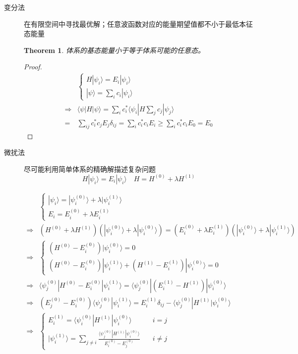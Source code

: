 \documentclass[12pt,a4paper,openany,twoside]{book}
\newtheorem{theorem}{Theorem}[section]
\numberwithin{equation}{section}
\newcommand{\ket}[1]{| #1 \rangle}
\newcommand{\bracket}[2]{\langle #1 | #2 \rangle}
\newcommand{\bracketl}[3]{\langle #1 | #2 | #3 \rangle}
\begin{document}
  \begin{description}
	  \item[变分法] 在有限空间中寻找最优解；任意波函数对应的能量期望值都不小于最低本征态能量

	  \begin{theorem}
	    体系的基态能量小于等于体系可能的任意态。
	  \end{theorem}

	  \begin{proof}
	    \begin{align}
	    &\begin{cases}
	    H\ket{\psi_i} = E_i\ket{\psi_i}\\
	    \ket{\psi}=\sum_i c_i \ket{\psi_i}
	    \end{cases}\\
	    \Rightarrow & \bracketl{\psi}{H}{\psi} = \sum_i c_i^* \bracketl{\psi_i}{H \sum_j c_j}{\psi_j} \\
	    =& \sum_{ij}c_i^*c_j E_j \delta_{ij}=\sum_i c_i^* c_i E_i \geq \sum_i c_i^* c_i E_{0}=E_{0}
	    \end{align}
	  \end{proof}

	  \item[微扰法] 尽可能利用简单体系的精确解描述复杂问题
	  \begin{equation}
	    H\ket{\psi_i}=E_i\ket{\psi_i} \quad H=H^{(0)} +\lambda H^{(1)}
	  \end{equation}

	  \begin{align*}
	    &\begin{cases}
	    \ket{\psi_i} = \ket{\psi_i^{(0)}}+\lambda \ket{\psi_i^{(1)}}\\
	    E_i=E_i^{(0)} + \lambda E_i^{(1)}
	    \end{cases}\\
	    \Rightarrow & (H^{(0)}+\lambda H^{(1)})(\ket{\psi^{(0)}_i}+\lambda \ket{\psi_i^{(0)}})=(E_i^{(0)}+\lambda E^{(1)}_i)(\ket   {\psi_i^{(0)}}+\lambda \ket{\psi^{(1)}_i}) \\
	    \Rightarrow & \begin{cases}
	    (H^{(0)}-E_i^{(0)})\ket{\psi_i^{(0)}}=0\\
	    (H^{(0)}-E_i^{(0)})\ket{\psi_i^{(1)}}+(H^{(1)}-E_i^{(1)})\ket{\psi_i^{(0)}} =0
	    \end{cases}\\
	    \Rightarrow & \bracketl{\psi_j^{(0)}}{H^{(0)}-E_i^{(0)}}{\psi_i^{(1)}}=\bracketl{\psi_j^{(0)}}{(E_i^{(1)}-H^{(1)})}{\psi_i^{  (0)}  }\\
	    \Rightarrow & (E_j^{(0)}-E_i^{(0)})\bracket{\psi_j^{(0)}}{\psi_i^{(1)}}=E_i^{(1)}\delta_{ij} -\bracketl{\psi^{(0)}_j}{H^{(1)}}    {\psi_i^{(0)}}\\
	    \Rightarrow &
	    \begin{cases}
	    E_i^{(1)}=\bracketl{\psi_i^{(0)}}{H^{(1)}}{\psi_i^{(0)}} &\quad i=j \\
	    \ket{\psi_i^{(1)}}=\sum_{j\neq i}\frac{\bracketl{\psi^{(0)}_j}{H^{(1)}}{\psi^{(0)}_i}}{E^{(0)}_i-E^{(0)}_j} &\quad i\neq j
	    \end{cases}
	  \end{align*}


\end{description}
\end{document}
